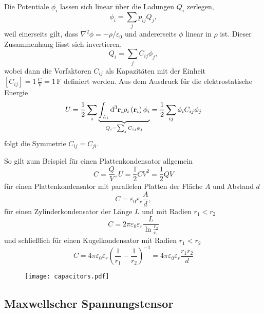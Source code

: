 Die Potentiale $\phi _{i}$ lassen sich linear über die Ladungen $Q_{i}$ zerlegen,
\begin{equation*}
	\phi _{i}=\sum _{j}p_{ij}Q_{j},
\end{equation*}
weil einerseits gilt, dass $\nabla ^{2}\phi =-\rho /\varepsilon _{0}$ und andererseits $\phi $ linear in $\rho $ ist. Dieser Zusammenhang lässt sich invertieren,
\begin{equation*}
	Q_{i}=\sum _{j}C_{ij}\phi _{j},
\end{equation*}
wobei dann die Vorfaktoren $C_{ij}$ als Kapazitäten mit der Einheit $\left[C_{ij}\right]=1\,\frac{\mathrm{C}}{\mathrm{V}}=1\,\mathrm{F}$ definiert werden. Aus dem Ausdruck für die elektrostatische Energie
\begin{equation*}
	U=\frac{1}{2}\sum _{i}\underset{Q_{i}=\sum _{j}C_{ij}\phi _{j}}{\underbrace{\int _{L_{i}}\text{d} ^{3}\mathbf{r}_{i}\rho _{i}\left(\mathbf{r}_{i}\right)\phi _{i}}}=\frac{1}{2}\sum _{ij}\phi _{i}C_{ij}\phi _{j}
\end{equation*}
folgt die Symmetrie $C_{ij}=C_{ji}$.

So gilt zum Beispiel für einen Plattenkondensator allgemein
\begin{equation*}
	C=\frac{Q}{V}, U=\frac{1}{2}CV^{2}=\frac{1}{2}QV
\end{equation*}
für einen Plattenkondensator mit parallelen Platten der Fläche $A$ und Abstand $d$
\begin{equation*}
	C=\varepsilon _{0}\varepsilon _{r}\frac{A}{d},
\end{equation*}
für einen Zylinderkondensator der Länge $L$ und mit Radien $r_{1}<r_{2}$
\begin{equation*}
	C=2\pi \varepsilon _{0}\varepsilon _{r}\frac{L}{\ln \frac{r_{2}}{r_{1}}}
\end{equation*}
und schließlich für einen Kugelkondensator mit Radien $r_{1}<r_{2}$
\begin{equation*}
	C=4\pi \varepsilon _{0}\varepsilon _{r}\left(\frac{1}{r_{1}}-\frac{1}{r_{2}}\right)^{-1}=4\pi \varepsilon _{0}\varepsilon _{r}\frac{r_{1}r_{2}}{d}
\end{equation*}


\begin{figure}[htb]
	\centering
	\texttt{[image: capacitors.pdf]}
	\caption{}
	\label{fig:capacitors}
\end{figure}



\subsection{Maxwellscher Spannungstensor\label{ref-027}}

